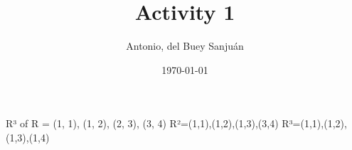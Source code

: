 \documentclass[fleqn, 10pt]{article}
\title{Activity 1}
\author{Antonio, del Buey Sanjuán}
\date{\today}
\theoremstyle{plain}
\theoremstyle{definition}
\begin{document}
    R³ of R = {(1, 1), (1, 2), (2, 3), (3, 4)}
    R²={(1,1),(1,2),(1,3),(3,4)}
    R³={(1,1),(1,2),(1,3),(1,4)}
  
\end{document}

